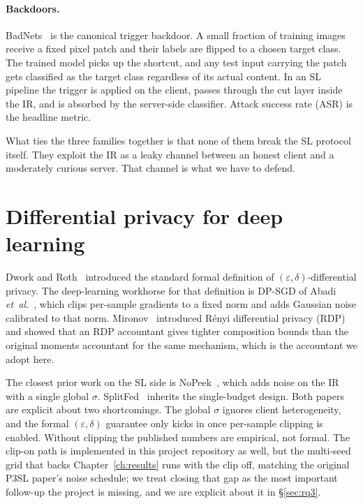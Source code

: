 \documentclass[11pt,a4paper,oneside]{report}
\begin{document}
\paragraph{Backdoors.}
BadNets~\cite{gu2017badnets} is the canonical trigger backdoor. A small
fraction of training images receive a fixed pixel patch and their
labels are flipped to a chosen target class. The trained model picks
up the shortcut, and any test input carrying the patch gets classified
as the target class regardless of its actual content. In an SL pipeline
the trigger is applied on the client, passes through the cut layer
inside the IR, and is absorbed by the server-side classifier. Attack
success rate (ASR) is the headline metric.

What ties the three families together is that none of them break the
SL protocol itself. They exploit the IR as a leaky channel between an
honest client and a moderately curious server. That channel is what
we have to defend.

\section{Differential privacy for deep learning}

Dwork and Roth~\cite{dwork2014algofoundations} introduced the standard
formal definition of $(\varepsilon, \delta)$-differential privacy. The
deep-learning workhorse for that definition is DP-SGD of Abadi
\textit{et~al.}~\cite{abadi2016dpsgd}, which clips per-sample
gradients to a fixed norm and adds Gaussian noise calibrated to that
norm. Mironov~\cite{mironov2017rdp} introduced R\'enyi differential
privacy (RDP) and showed that an RDP accountant gives tighter
composition bounds than the original moments accountant for the same
mechanism, which is the accountant we adopt here.

The closest prior work on the SL side is
NoPeek~\cite{vepakomma2020nopeek}, which adds noise on the IR with a
single global $\sigma$. SplitFed~\cite{thapa2022splitfed,sun2020splitfed}
inherits the single-budget design. Both papers are explicit about two
shortcomings. The global $\sigma$ ignores client heterogeneity, and
the formal $(\varepsilon, \delta)$ guarantee only kicks in once
per-sample clipping is enabled. Without clipping the published
numbers are empirical, not formal. The clip-on path is implemented
in this project repository as well, but the multi-seed grid that
backs Chapter~\ref{ch:results} runs with the clip off, matching the
original P3SL paper's noise schedule; we treat closing that gap as
the most important follow-up the project is missing, and we are
explicit about it in \S\ref{sec:rq3}.
\end{document}
